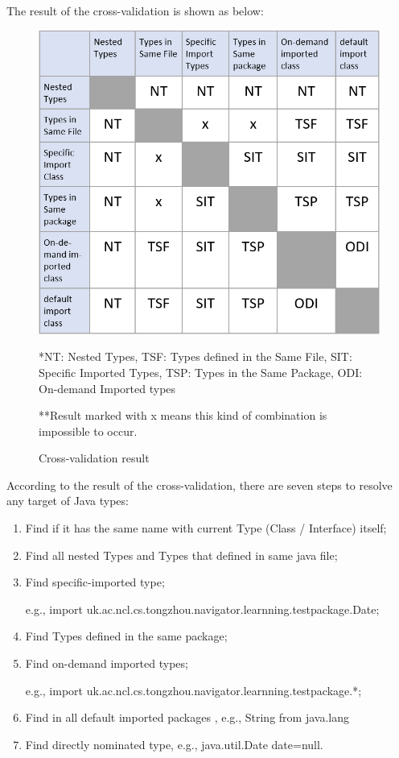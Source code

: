 \documentclass[runningheads]{llncs}
\begin{document}
The result of the cross-validation is shown as below:

\begin{figure}[H]
	\centering
	\includegraphics[width=12cm]{pic/cross-validation-result.png}
	\caption*{*NT: Nested Types, TSF: Types defined in the Same File, SIT: Specific Imported Types, TSP: Types in the Same Package, ODI: On-demand Imported types}
	\caption*{**Result marked with x means this kind of combination is impossible to occur.}
	\caption{Cross-validation result}
	\label{Cross-validation result}
\end{figure}

According to the result of the cross-validation, there are seven steps to resolve any target of Java types:

\begin{enumerate}
	\item Find if it has the same name with current Type (Class / Interface) itself;
	\item Find all nested Types and Types that defined in same java file;
	\item Find specific-imported type;

	e.g., import uk.ac.ncl.cs.tongzhou.navigator.learnning.testpackage.Date;
	\item Find Types defined in the same package;
	\item Find on-demand imported types;

	e.g., import uk.ac.ncl.cs.tongzhou.navigator.learnning.testpackage.*;
	\item Find in all default imported packages 
	, e.g., String from java.lang
	\item Find directly nominated type, e.g.,  java.util.Date date=null.
\end{enumerate}
\end{document}
